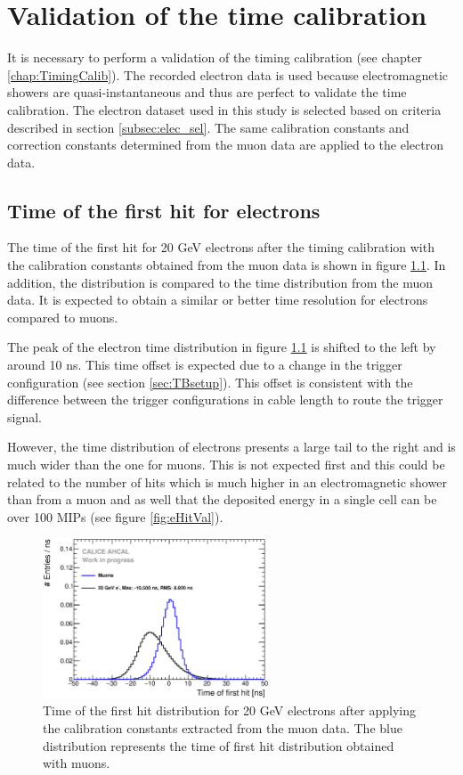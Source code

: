 \chapter{Validation of the time calibration}
\label{chap:TimingValidation}

It is necessary to perform a validation of the timing calibration (see chapter \ref{chap:TimingCalib}). The recorded electron data is used because electromagnetic showers are quasi-instantaneous and thus are perfect to validate the time calibration. The electron dataset used in this study is selected based on criteria described in section \ref{subsec:elec_sel}. The same calibration constants and correction constants determined from the muon data are applied to the electron data.

\section{Time of the first hit for electrons}

The time of the first hit for 20 GeV electrons after the timing calibration with the calibration constants obtained from the muon data is shown in figure \ref{fig:Timing_electrons}. In addition, the distribution is compared to the time distribution from the muon data. It is expected to obtain a similar or better time resolution for electrons compared to muons.

The peak of the electron time distribution in figure \ref{fig:Timing_electrons} is shifted to the left by around 10 ns. This time offset is expected due to a change in the trigger configuration (see section \ref{sec:TBsetup}). This offset is consistent with the difference between the trigger configurations in cable length to route the trigger signal.

However, the time distribution of electrons presents a large tail to the right and is much wider than the one for muons. This is not expected first and this could be related to the number of hits which is much higher in an electromagnetic shower than from a muon and as well that the deposited energy in a single cell can be over 100 MIPs (see figure \ref{fig:eHitVal}).

\begin{figure}[htbp!]
	\centering
	\includegraphics[width=0.6\textwidth]{../Thesis_Plots/Timing/Electrons/Plots/Timing_AllLayers_AfterMuons.eps}
	\caption{Time of the first hit distribution for 20 GeV electrons after applying the calibration constants extracted from the muon data. The blue distribution represents the time of first hit distribution obtained with muons.}
	\label{fig:Timing_electrons}
\end{figure}


